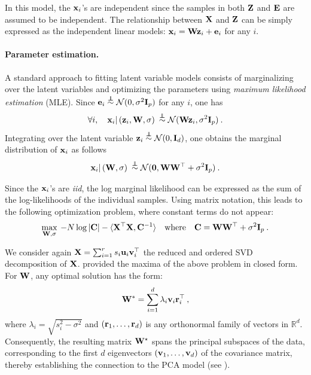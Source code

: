 In this model, the ${\mathbf{x}}_i$'s are independent since the samples in both ${\mathbf{Z}}$ and ${\mathbf{E}}$ are assumed to be independent. The relationship between ${\mathbf{X}}$ and ${\mathbf{Z}}$ can be simply expressed as the independent linear models: ${\mathbf{x}}_i = {\mathbf{W}} {\mathbf{z}}_i + {\mathbf{e}}_i$ for any $i$.

\paragraph{Parameter estimation.} A standard approach to fitting latent variable models consists of marginalizing over the latent variables and optimizing the parameters using \emph{maximum likelihood estimation} (MLE). Since ${\mathbf{e}}_i \stackrel{\perp\!\!\!\!\perp}{\sim} \mathcal{N}(0, \sigma^2 {\mathbf{I}}_p)$ for any $i$, one has
\begin{align}\label{eq:ppca_likelihood}
    \forall i, \quad {\mathbf{x}}_i | \left( {\mathbf{z}}_i, {\mathbf{W}}, \sigma \right) \: \stackrel{\perp\!\!\!\!\perp}{\sim} \mathcal{N}({\mathbf{W}} {\mathbf{z}}_i, \sigma^2 {\mathbf{I}}_p) \:.
\end{align}
Integrating over the latent variable ${\mathbf{z}}_i \stackrel{\perp\!\!\!\!\perp}{\sim} \mathcal{N}(0, {\mathbf{I}}_d)$, one obtains the marginal distribution of ${\mathbf{x}}_i$ as follows
\begin{align}\label{eq:ppca_marginal}
    {\mathbf{x}}_i | \left( {\mathbf{W}}, \sigma \right) \: \stackrel{\perp\!\!\!\!\perp}{\sim} \mathcal{N}(\bm{0}, {\mathbf{W}} {\mathbf{W}}^\top + \sigma^2 {\mathbf{I}}_p) \:.
\end{align}

Since the ${\mathbf{x}}_i$'s are \emph{iid}, the log marginal likelihood can be expressed as the sum of the log-likelihoods of the individual samples. Using matrix notation, this leads to the following optimization problem, where constant terms do not appear:
\begin{align}
    \max_{{\mathbf{W}}, \sigma} \: -N \log |{\mathbf{C}}| - \langle {\mathbf{X}}^\top {\mathbf{X}}, {\mathbf{C}}^{-1} \rangle \quad \text{where} \quad {\mathbf{C}} = {\mathbf{W}} {\mathbf{W}}^\top + \sigma^2 {\mathbf{I}}_p \:.
\end{align}

We consider again ${\mathbf{X}} = \sum_{i=1}^{r} s_i {\mathbf{u}}_i {\mathbf{v}}_i^\top$ the reduced and ordered SVD decomposition of ${\mathbf{X}}$. \cite{tipping1999probabilistic} provided the maxima of the above problem in closed form. For ${\mathbf{W}}$, any optimal solution has the form:
\begin{align}
    {\mathbf{W}}^* = \sum_{i=1}^d \lambda_i {\mathbf{v}}_i {\mathbf{r}}_i^\top \:,
\end{align}
where $\lambda_i = \sqrt{s_i^{2} - \sigma^{2}}$ and $({\mathbf{r}}_1, \dots, {\mathbf{r}}_d)$ is any orthonormal family of vectors in $\mathbb{R}^d$. Consequently, the resulting matrix ${\mathbf{W}}^\star$ spans the principal subspaces of the data, corresponding to the first $d$ eigenvectors $({\mathbf{v}}_1, \dots, {\mathbf{v}}_d)$ of the covariance matrix, thereby establishing the connection to the PCA model (see ).

